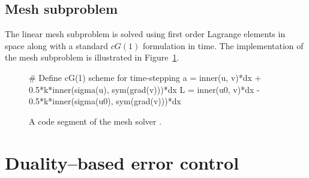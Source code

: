 \newpage
\subsection{Mesh subproblem}

The linear mesh subproblem is solved using first order Lagrange
elements in space along with a standard $cG(1)$ formulation in time.
The implementation of the mesh subproblem is illustrated in
Figure~\ref{selim:fig:meshsolver}.
\begin{figure}
\caption{A code segment of the mesh solver .}
\label{selim:fig:meshsolver}
\begin{python}
  # Define cG(1) scheme for time-stepping
  a = inner(u, v)*dx + 0.5*k*inner(sigma(u), sym(grad(v)))*dx
  L = inner(u0, v)*dx - 0.5*k*inner(sigma(u0), sym(grad(v)))*dx
\end{python}
\end{figure}

\section{Duality--based error control}

